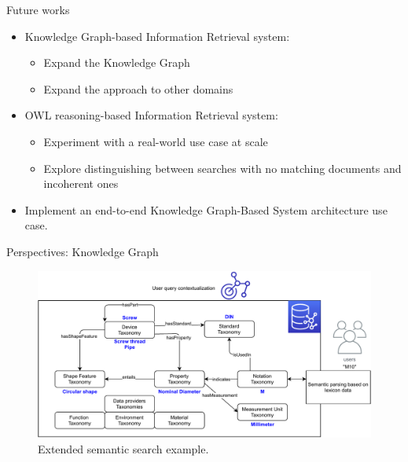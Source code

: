 \begin{frame}{Future works}

    \begin{itemize}
        \item Knowledge Graph-based Information Retrieval system:
        \begin{itemize}
            \item Expand the Knowledge Graph
            \item Expand the approach to other domains
        \end{itemize}
        \item OWL reasoning-based Information Retrieval system:
        \begin{itemize}
            \item Experiment with a real-world use case at scale
            \item Explore distinguishing between searches with no matching documents and incoherent ones 
        \end{itemize}
        \item Implement an end-to-end Knowledge Graph-Based System architecture use case.
    \end{itemize}

\end{frame}

\begin{frame}{Perspectives: Knowledge Graph}

    \begin{figure} [H]
        \begin{center}
            \includegraphics[scale=0.5]{images/semantic_search_example.pdf} 
            \caption{Extended semantic search example.} 
        \end{center}
    \end{figure}

\end{frame}

